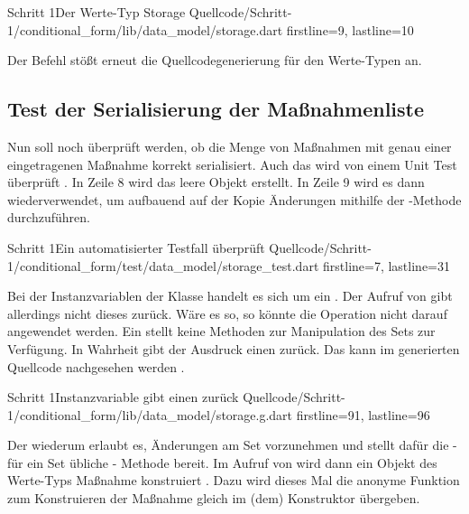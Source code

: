 \begin{alexlisting}{Schritt 1}{Der Werte-Typ Storage}
  {Quellcode/Schritt-1/conditional_form/lib/data_model/storage.dart}
  {firstline=9, lastline=10}
  \label{lst:Schritt1WerteTypStorage}
\end{alexlisting}

Der Befehl   stößt erneut die Quellcodegenerierung für den Werte-Typen  an.

\subsection{Test der Serialisierung der Maßnahmenliste}

Nun soll noch überprüft werden, ob die Menge von Maßnahmen mit genau einer eingetragenen Maßnahme korrekt serialisiert.
Auch das wird von einem Unit Test überprüft \Lst{\ref{lst:Schritt1MassnahmenSerialisierenOhneFehlerUnitTest}}.
In Zeile 8 wird das leere Objekt  erstellt.
In Zeile 9 wird es dann wiederverwendet, um aufbauend auf der Kopie Änderungen mithilfe der -Methode durchzuführen.

\begin{alexlisting}{Schritt 1}{Ein automatisierter Testfall überprüft}
  {Quellcode/Schritt-1/conditional_form/test/data_model/storage_test.dart}
  {firstline=7, lastline=31}
  \label{lst:Schritt1MassnahmenSerialisierenOhneFehlerUnitTest}
\end{alexlisting}

Bei der Instanzvariablen  der Klasse  handelt es sich um ein .
 Der Aufruf von   gibt allerdings nicht dieses  zurück. Wäre es so, so könnte die Operation  nicht  darauf angewendet werden. Ein  stellt keine Methoden zur Manipulation des Sets zur Verfügung. In Wahrheit gibt der Ausdruck  einen  zurück. Das kann im generierten Quellcode nachgesehen werden \LstZ{\ref{lst:Schritt1InstanzvariableMassnahmenGibtEinenSetBuilderZurueck}}.

\begin{alexlisting}{Schritt 1}{Instanzvariable  gibt einen  zurück}
  {Quellcode/Schritt-1/conditional_form/lib/data_model/storage.g.dart}
  {firstline=91, lastline=96}
  \label{lst:Schritt1InstanzvariableMassnahmenGibtEinenSetBuilderZurueck}
\end{alexlisting}

Der  wiederum erlaubt es, Änderungen am Set vorzunehmen und stellt dafür die - für ein Set übliche - Methode  bereit.
Im Aufruf von  wird dann ein Objekt des Werte-Typs Maßnahme konstruiert .
Dazu wird dieses Mal die anonyme Funktion zum Konstruieren der Maßnahme gleich im (dem) Konstruktor übergeben.


